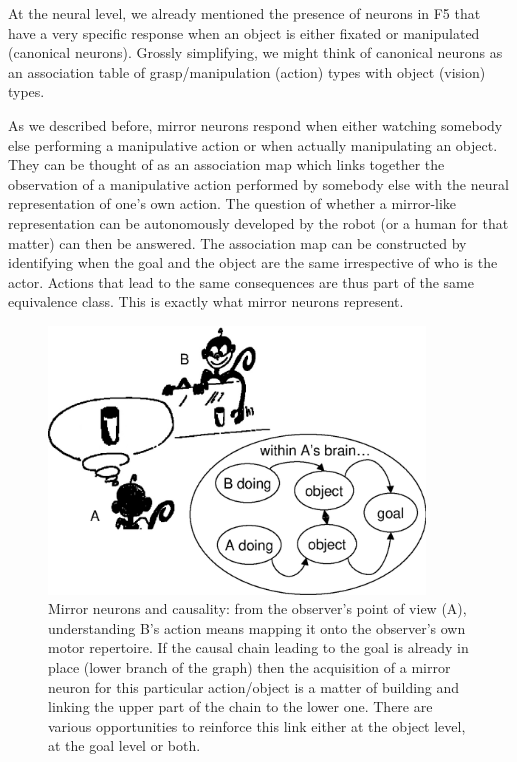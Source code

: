 \ifverbose
At the neural level, we already mentioned the presence of neurons in
F5 that have a very specific response when an object is either fixated
or manipulated (canonical neurons). Grossly simplifying, we might
think of canonical neurons as an association table of
grasp/manipulation (action) types with object (vision) types.
\fi

As we described before, mirror neurons respond when either watching 
somebody else performing a manipulative action or when actually 
manipulating an object. They can be thought of as an 
association map which links together the observation of a manipulative 
action performed by somebody else with the neural representation of one's 
own action. The question of whether a mirror-like representation can be
autonomously developed by the robot (or a human for that matter) can
then be answered. The association map can be constructed by
identifying when the goal and the object are the same irrespective of
who is the actor. Actions that lead to the same consequences are thus
part of the same equivalence class.  This is exactly what mirror neurons
represent.

\begin{figure}[tb]
\begin{center}
\includegraphics[width=10cm]{mirror-monkey.eps}
\caption{ 
\label{fig:mirror-monkey}
%
Mirror neurons and causality: from the observer's point
of view (A), understanding B's action means mapping it onto the
observer's own
motor repertoire. If the causal chain leading to the goal is already
in place (lower branch of the graph) then the acquisition of a
mirror neuron for this particular action/object is a matter of
building and linking the upper part of the chain to the lower one.
There are various opportunities to reinforce this link either at the object
level, at the goal level or both. 
%
}
\end{center}
\end{figure}


